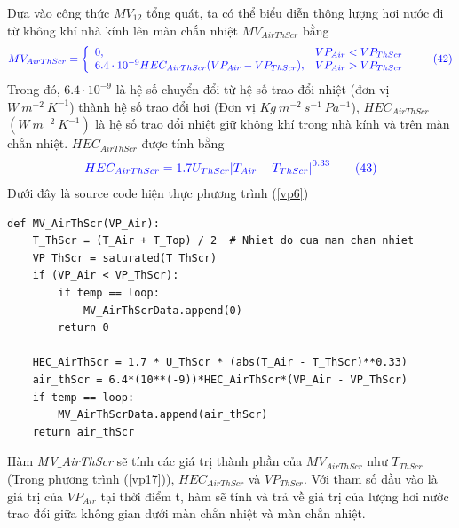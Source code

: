 \documentclass[13pt,a4paper]{article}
\begin{document}
			Dựa vào công thức $MV_{12}$ tổng quát, ta có thể biểu diễn thông lượng hơi nước đi từ không khí nhà kính lên màn chắn nhiệt $MV_{AirThScr}$ bằng
			\begin{align}
				\color{blue}
				MV_{AirThScr} = \left\{\begin{array}{llr}
					0,& VP_{Air} < VP_{ThScr} \\
					6.4\cdot 10^{-9} HEC_{AirThScr}(VP_{Air} - VP_{ThScr}), & VP_{Air} > VP_{ThScr}
				\end{array}\right.
				\color{blue}
				\tag{42}\label{vp16}
			\end{align}
			Trong đó, $6.4\cdot 10^{-9}$ là hệ số chuyển đổi từ hệ số trao đổi nhiệt (đơn vị $W\ m^{-2}\ K^{-1}$) thành hệ số trao đổi hơi (Đơn vị $Kg\ m^{-2}\ s^{-1}\ Pa^{-1}$), $HEC_{AirThScr}$ $(W\ m^{-2}\ K^{-1})$ là hệ số trao đổi nhiệt giữ không khí trong nhà kính và trên màn chắn nhiệt. $HEC_{AirThScr}$ được tính bằng 
			\begin{align}
				\color{blue}
					HEC_{AirThScr} = 1.7U_{ThScr}{|T_{Air} - T_{ThScr}|}^{0.33}
				\color{blue}
				\tag{43}\label{vp17}
			\end{align}
			Dưới đây là source code hiện thực phương trình (\ref{vp6})
\begin{lstlisting}
def MV_AirThScr(VP_Air):
	T_ThScr = (T_Air + T_Top) / 2  # Nhiet do cua man chan nhiet
	VP_ThScr = saturated(T_ThScr)
	if (VP_Air < VP_ThScr):
		if temp == loop: 
			MV_AirThScrData.append(0)
		return 0
	
	HEC_AirThScr = 1.7 * U_ThScr * (abs(T_Air - T_ThScr)**0.33)
	air_thScr = 6.4*(10**(-9))*HEC_AirThScr*(VP_Air - VP_ThScr)
	if temp == loop: 
		MV_AirThScrData.append(air_thScr)
	return air_thScr
\end{lstlisting}
			Hàm \textit{MV$\_$AirThScr} sẽ tính các giá trị thành phần của $MV_{AirThScr}$ như $T_{ThScr}$ (Trong phương trình (\ref{vp17})), $HEC_{AirThScr}$ và $VP_{ThScr}$. Với tham số đầu vào là giá trị của $VP_{Air}$ tại thời điểm t, hàm sẽ tính và trả về giá trị của lượng hơi nước trao đổi giữa không gian dưới màn chắn nhiệt và màn chắn nhiệt. \\ \\
			
\end{document}

